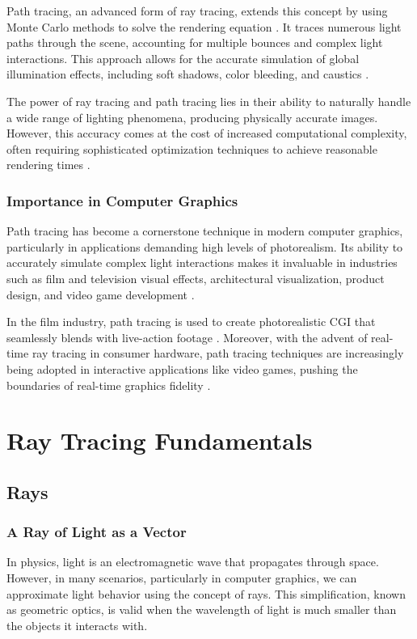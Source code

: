 \documentclass[12pt]{article}
\begin{document}
Path tracing, an advanced form of ray tracing, extends this concept by using Monte Carlo methods to solve the rendering equation \cite{Kajiya1986}. It traces numerous light paths through the scene, accounting for multiple bounces and complex light interactions. This approach allows for the accurate simulation of global illumination effects, including soft shadows, color bleeding, and caustics \cite{Veach1997}.

The power of ray tracing and path tracing lies in their ability to naturally handle a wide range of lighting phenomena, producing physically accurate images. However, this accuracy comes at the cost of increased computational complexity, often requiring sophisticated optimization techniques to achieve reasonable rendering times \cite{Pharr2016}.
\subsubsection{Importance in Computer Graphics}
Path tracing has become a cornerstone technique in modern computer graphics, particularly in applications demanding high levels of photorealism. Its ability to accurately simulate complex light interactions makes it invaluable in industries such as film and television visual effects, architectural visualization, product design, and video game development \cite{Keller2015}.

In the film industry, path tracing is used to create photorealistic CGI that seamlessly blends with live-action footage \cite{Christensen2018}. Moreover, with the advent of real-time ray tracing in consumer hardware, path tracing techniques are increasingly being adopted in interactive applications like video games, pushing the boundaries of real-time graphics fidelity \cite{Schied2017}.
\section{Ray Tracing Fundamentals}
\label{sec:fundamentals}

\subsection{Rays}
\subsubsection{A Ray of Light as a Vector}
In physics, light is an electromagnetic wave that propagates through space. However, in many scenarios, particularly in computer graphics, we can approximate light behavior using the concept of rays. This simplification, known as geometric optics, is valid when the wavelength of light is much smaller than the objects it interacts with.
\end{document}
